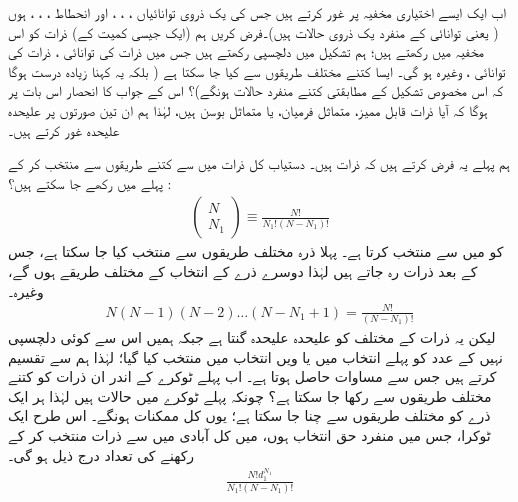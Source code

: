  اب ایک ایسے اختیاری مخفیہ پر غور کرتے ہیں جس کی یک ذروی توانائیاں ، ، ،  اور انحطاط ، ، ،  ہوں ( یعنی توانائی  کے  منفرد یک ذروی حالات ہیں)۔فرض کریں ہم (ایک جیسی کمیت کے)  ذرات کو اس ‏مخفیہ میں رکھتے ہیں؛ ہم تشکیل  میں دلچسپی رکھتے ہیں جس میں  ذرات کی توانائی ،  ذرات کی توانائی ، وغیرہ ہو گی۔ ایسا کتنے مختلف طریقوں سے کیا جا سکتا ہے ( بلکہ یہ کہنا زیادہ درست ہوگا کہ اس مخصوص تشکیل کے مطابقتی کتنے منفرد حالات ہونگے)؟ اس کے جواب  کا انحصار اس بات پر ہوگا کہ آیا ذرات قابل ممیز، متماثل فرميان، یا متماثل بوسن ہیں، لہٰذا ہم ان تین صورتوں پر علیحدہ علیحدہ غور کرتے ہیں۔
 
 ہم پہلے یہ فرض کرتے ہیں کہ ذرات  ہیں۔ دستیاب کل  ذرات میں سے کتنے طریقوں سے  منتخب کر کے پہلے  میں رکھے جا سکتے ہیں؟  :
\begin{align}\label{مساوات_متماثل_ثنائی_عددی_سر_پہلا}
\begin{pmatrix}
N \\
N_1
\end{pmatrix}
\equiv \frac{N!}{N_1 ! (N - N_1) !}
\end{align}
  کو  میں سے منتخب کرتا ہے۔ پہلا ذرہ  مختلف طریقوں سے منتخب کیا جا سکتا ہے، جس کے بعد  ذرات رہ جاتے ہیں لہٰذا دوسرے ذرے کے انتخاب کے  مختلف طریقے ہوں گے، وغیرہ۔ 
\begin{align*}
N(N - 1) (N - 2) \dotsc (N - N_1 + 1) = \frac{N !}{(N - N_1) !}
\end{align*}
لیکن یہ  ذرات کے  مختلف  کو علیحدہ علیحدہ گنتا ہے جبکہ ہمیں اس سے کوئی دلچسپی نہیں کے عدد  کو پہلے انتخاب میں یا  ویں انتخاب میں منتخب کیا گیا؛ لہٰذا ہم  سے تقسیم کرتے ہیں جس سے مساوات  حاصل ہوتا ہے۔ اب پہلے ٹوکرے کے اندر ان  ذرات کو کتنے مختلف طریقوں سے رکھا جا سکتا ہے؟ چونکہ پہلے ٹوکرے میں  حالات ہیں لہٰذا ہر ایک ذرے کو  مختلف طریقوں سے چنا جا سکتا ہے؛ یوں کل ممکنات  ہونگے۔ اس طرح ایک ٹوکرا، جس میں  منفرد حق انتخاب ہوں، میں کل آبادی  میں سے  ذرات منتخب کر کے رکھنے کی تعداد درج ذیل ہو گی۔ 
\begin{align*}
\frac{N ! d_1^{N_1}}{N_1 ! (N - N_1) !}
\end{align*}
